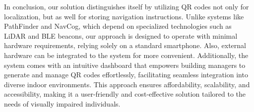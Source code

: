In conclusion, our solution distinguishes itself by utilizing QR codes not only for localization, but as well for storing navigation instructions. Unlike systems like PathFinder and NavCog, which depend on specialized technologies such as LiDAR and BLE beacons, our approach is designed to operate with minimal hardware requirements, relying solely on a standard smartphone. Also, external hardware can be integrated to the system for more convenient. Additionally, the system comes with an intuitive dashboard that empowers building managers to generate and manage QR codes effortlessly, facilitating seamless integration into diverse indoor environments. This approach ensures affordability, scalability, and accessibility, making it a user-friendly and cost-effective solution tailored to the needs of visually impaired individuals.
